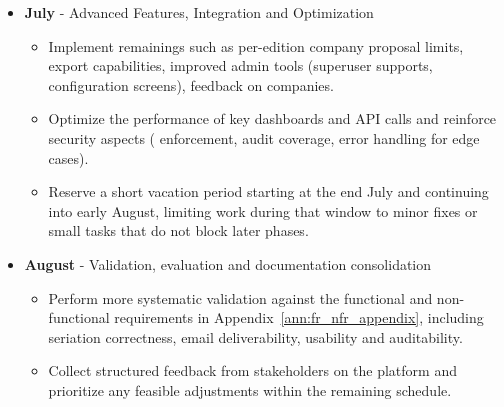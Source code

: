 {\begin{itemize}
{\begin{itemize}
{                            Refine the ERD and database schema based on usage and performance observations (indexes, additional constraints, small structural adjustments).
                        }
                        \item {
                            Expand automated testing (unit/integration tests) and conduct targeted non-functional checks (performance of critical queries, RLS correctness).
                        }
                    \end{itemize}
                }
                \item {
                    {\textbf{July} - Advanced Features, Integration and Optimization}
                    \begin{itemize}
                        \item {
                            Implement remainings such as per-edition company proposal limits, export capabilities, improved admin tools (superuser supports, configuration screens),
                            feedback on companies.
                        }
                        \item {
                            Optimize the performance of key dashboards and API calls and reinforce security aspects ( enforcement, audit coverage, error handling for edge cases).
                        }
                        \item {
                            Reserve a short vacation period starting at the end July and continuing into early August, limiting work during that window to minor fixes
                            or small tasks that do not block later phases.
                        }
                    \end{itemize}
                }
                \item {
                    {\textbf{August} - Validation, evaluation and documentation consolidation}
                    \begin{itemize}
                        \item {
                            Perform more systematic validation against the functional and non-functional requirements in Appendix~\ref{ann:fr_nfr_appendix},
                            including seriation correctness, email deliverability, usability and auditability. 
                        }
                        \item {
                            Collect structured feedback from stakeholders on the platform and prioritize any feasible adjustments within the remaining schedule.
}
\end{itemize}}
\end{itemize}}

